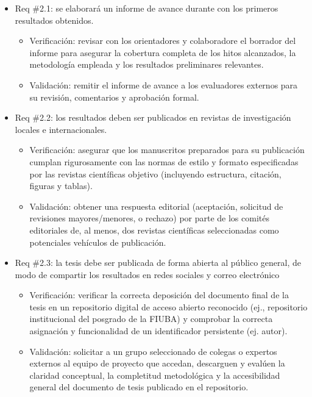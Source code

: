 \documentclass[
11pt, %
]{charter}
\begin{document}
\begin{itemize}
    \item Req \#2.1: se elaborará un informe de avance durante con los primeros resultados obtenidos.
    \begin{itemize}
        \item Verificación: revisar con los orientadores y colaboradore el borrador del informe para asegurar la cobertura completa de los hitos alcanzados, la metodología empleada y los resultados preliminares relevantes.
        \item Validación: remitir el informe de avance a los evaluadores externos para su revisión, comentarios y aprobación formal.
    \end{itemize}

    \item Req \#2.2: los resultados deben ser publicados en revistas de investigación locales e internacionales.
    \begin{itemize}
        \item Verificación: asegurar que los manuscritos preparados para su publicación cumplan rigurosamente con las normas de estilo y formato especificadas por las revistas científicas objetivo (incluyendo estructura, citación, figuras y tablas).
        \item Validación: obtener una respuesta editorial (aceptación, solicitud de revisiones mayores/menores, o rechazo) por parte de los comités editoriales de, al menos, dos revistas científicas seleccionadas como potenciales vehículos de publicación.
    \end{itemize}

    \item Req \#2.3: la tesis debe ser publicada de forma abierta al público general, de modo de compartir los resultados en redes sociales y correo electrónico
    \begin{itemize}
        \item Verificación: verificar la correcta deposición del documento final de la tesis en un repositorio digital de acceso abierto reconocido (ej., repositorio institucional del posgrado de la FIUBA) y comprobar la correcta asignación y funcionalidad de un identificador persistente (ej. autor).
        \item Validación: solicitar a un grupo seleccionado de colegas o expertos externos al equipo de proyecto que accedan, descarguen y evalúen la claridad conceptual, la completitud metodológica y la accesibilidad general del documento de tesis publicado en el repositorio.
    \end{itemize}
\end{itemize}
\end{document}
